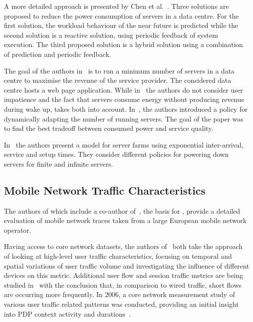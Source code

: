 A more detailed approach is presented by Chen et al.~\cite{Chen2005}. Three solutions are proposed to reduce the power consumption of servers in a data centre.
For the first solution, the workload behaviour of the near future is predicted while the second solution is a reactive solution, using periodic feedback of system execution.
The third proposed solution is a hybrid solution using a combination of prediction and periodic feedback.

The goal of the authors in~\cite{Mazzucco2010a, Dyachuk2010, Mazzucco2010b} is to run a minimum number of servers in a data centre to maximise the revenue of the service provider.
The considered data centre hosts a web page application. While in~\cite{Mazzucco2010a} the authors do not consider user impatience and the fact that servers consume energy without producing revenue during wake up, \cite{Mazzucco2010b} takes both into account. In~\cite{Dyachuk2010}, the authors introduced a policy for dynamically adapting the number of running servers. The goal of the paper was to find the best tradeoff between consumed power and service quality.

In~\cite{Gandhi2010} the authors present a model for server farms using exponential inter-arrival, service and setup times. They consider different policies for powering down servers for finite and infinite servers.


\subsection{Mobile Network Traffic Characteristics}
The authors of \cite{Metzger2014} which include a co-author of~\cite{Metzger2014a}, the basis for , provide a detailed evaluation of mobile network traces taken from a large European mobile network operator.

Having access to core network datasets, the authors of~\cite{Shafiq2011, Paul2011} both take the approach of looking at high-level user traffic characteristics, focusing on temporal and spatial variations of user traffic volume and investigating the influence of different devices on this metric.
Additional user flow and session traffic metrics are being studied in~\cite{Zhang2012} with the conclusion that, in comparison to wired traffic, short flows are occurring more frequently.
In 2006, a core network measurement study of various user traffic related patterns was conducted, providing an initial insight into \gls{PDP} context activity and durations~\cite{Svoboda2006}.

